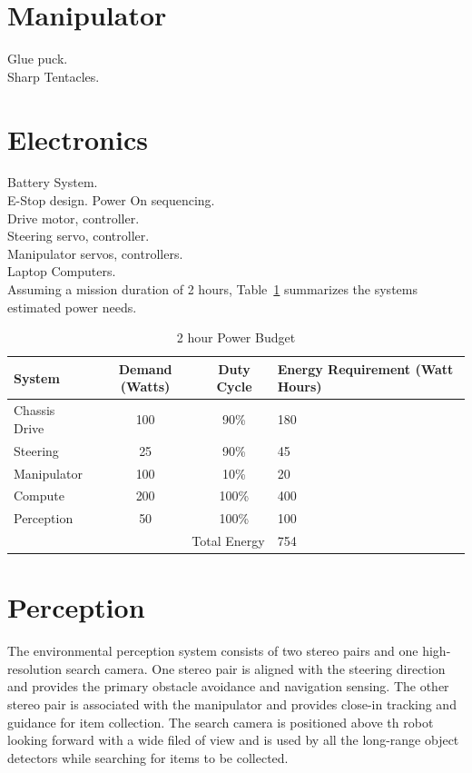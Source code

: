 \documentclass[12pt]{article}
\begin{document}
\section{Manipulator}\label{Manipulator}

Glue puck.\\

Sharp Tentacles.\\

\section{Electronics}\label{Electronics}

Battery System.\\

E-Stop design. Power On sequencing.\\

Drive motor, controller.\\

Steering servo, controller.\\

Manipulator servos, controllers.\\

Laptop Computers.\\

Assuming a mission duration of 2 hours, Table~\ref{power budget} summarizes the systems estimated power needs.

\begin{table}
    \caption{2 hour Power Budget}
    \label{power budget}
    \begin{tabular}{|l|c|c||p{4cm}|}
        \hline
        System & Demand (Watts) & Duty Cycle & Energy Requirement (Watt Hours)\\
        \hline
        Chassis Drive & 100 & 90\% & 180\\
        Steering & 25 & 90\% & 45\\
        Manipulator & 100 & 10\% & 20\\
        Compute & 200 & 100\% & 400\\
        Perception & 50 & 100\% & 100\\
        \hline
        \multicolumn{3}{|r||}{Total Energy} & 754\\
        \hline
    \end{tabular}
\end{table}

\section{Perception}\label{Perception}
The environmental perception system consists of two stereo pairs and one high-resolution search camera. One stereo pair is aligned with the steering direction and provides the primary obstacle avoidance and navigation sensing. The other stereo pair is associated with the manipulator and provides close-in tracking and guidance for item collection. The search camera is positioned above th robot looking forward with a wide filed of view and is used by all the long-range object detectors while searching for items to be collected.
\end{document}
